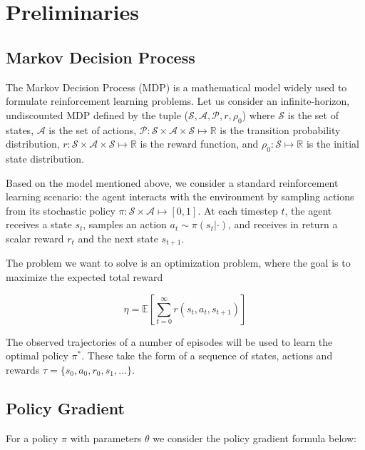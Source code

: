 \section{Preliminaries}
\label{sec:preleminaries}


\subsection{Markov Decision Process}
The Markov Decision Process (MDP) is a mathematical model widely used to formulate reinforcement learning problems. Let us consider an infinite-horizon, undiscounted MDP defined by the tuple ($\mathcal{S}, \mathcal{A}, \mathcal{P}, r, \rho_0$) where $\mathcal{S}$ is the set of states, $\mathcal{A}$ is the set of actions, $\mathcal{P}: \mathcal{S}\times\mathcal{A}\times\mathcal{S}\mapsto \mathbb{R}$ is the transition probability distribution, $r: \mathcal{S}\times\mathcal{A}\times\mathcal{S} \mapsto \mathbb{R}$ is the reward function, and $\rho_0:\mathcal{S}\mapsto\mathbb{R}$ is the initial state distribution.

Based on the model mentioned above, we consider a standard reinforcement learning scenario: the agent interacts with the environment by sampling actions from its stochastic policy $\pi:\mathcal{S}\times\mathcal{A}\mapsto[0,1]$. At each timestep $t$, the agent receives a state $s_t$, samples an action $a_t \sim \pi(s_t | \cdot)$, and receives in return a scalar reward $r_t$ and the next state $s_{t+1}$. 

The problem we want to solve is an optimization problem, where the goal is to maximize the expected total reward

\[
\eta = \mathbb{E}
\left[ \sum_{t=0}^{\infty}r(s_t, a_t, s_{t+1})\right]
\] 

The observed trajectories of a number of episodes will be used to learn the optimal policy $\pi^*$. These take the form of a sequence of states, actions and rewards $\tau = \{s_0, a_0, r_0, s_1, ... \}$. 


\subsection{Policy Gradient}
For a policy $\pi$ with parameters $\theta$ we consider the policy gradient formula below:

